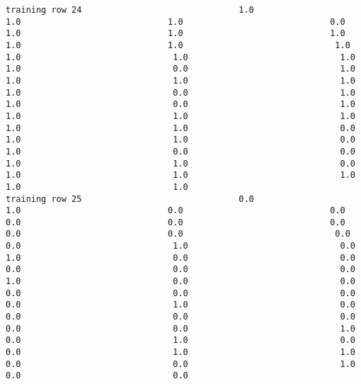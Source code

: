 \documentclass[11pt]{article}
\begin{document}
\begin{verbatim}
training row 24                               1.0                             1.0                             1.0                             0.0                             1.0                             1.0                             1.0                             1.0                             1.0                              1.0                              1.0                              1.0                              1.0                              1.0                              0.0                              1.0                              1.0                              1.0                              1.0                              1.0                              0.0                              1.0                              1.0                              0.0                              1.0                              1.0                              1.0                              1.0                              1.0                              1.0                              0.0                              1.0                              1.0                              0.0                              1.0                              0.0                              0.0                              1.0                              1.0                              0.0                              1.0                              1.0                              1.0                              1.0                              1.0
training row 25                               0.0                             1.0                             0.0                             0.0                             0.0                             0.0                             0.0                             0.0                             0.0                              0.0                              0.0                              1.0                              0.0                              1.0                              0.0                              0.0                              0.0                              0.0                              0.0                              1.0                              0.0                              0.0                              0.0                              0.0                              0.0                              0.0                              1.0                              0.0                              0.0                              0.0                              0.0                              0.0                              0.0                              1.0                              0.0                              1.0                              0.0                              0.0                              1.0                              1.0                              0.0                              0.0                              1.0                              0.0                              0.0

\end{verbatim}
\end{document}
